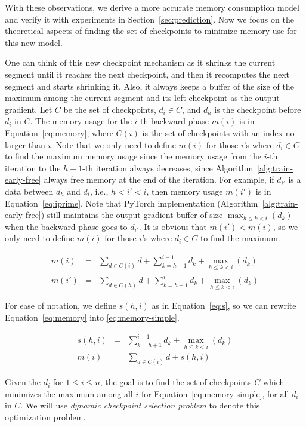 With these observations, we derive a more accurate memory consumption model and verify it with experiments in Section~\ref{sec:prediction}.
Now we focus on the theoretical aspects of finding the set of checkpoints to minimize memory use for this new model.

One can think of this new checkpoint mechanism as it shrinks the current segment until it reaches the next checkpoint, and then it recomputes the next segment and starts shrinking it. 
Also, it always keeps a buffer of the size of the maximum among the current segment and its left checkpoint as the output gradient.
Let $C$ be the set of checkpoints, $d_i \in C$, and $d_h$ is the checkpoint before $d_i$ in $C$. 
The memory usage for the $i$-th backward phase $m(i)$ is in Equation~\ref{eq:memory}, where $C(i)$ is the set of checkpoints with an index no larger than $i$.
Note that we only need to define $m(i)$ for those $i$'s where $d_i \in C$ to find the maximum memory usage since the memory usage from the $i$-th iteration to the $h-1$-th iteration always decreases, since Algorithm~\ref{alg:train-early-free} always free memory at the end of the iteration.  
For example, if $d_{{i'}}$ is a data between $d_h$ and $d_i$,  i.e., $h < i' < i$, then memory usage $m(i')$ is in Equation~\ref{eq:iprime}.
Note that PyTorch implementation (Algorithm~\ref{alg:train-early-free}) still maintains the output gradient buffer of size $\max_{h \leq k < i}(d_k)$ when the backward phase goes to $d_{i'}$.
It is obvious that $m(i') < m(i)$, so we only need to define $m(i)$ for those $i$'s where $d_i \in C$ to find the maximum.

\begin{eqnarray}
m(i) & = & \sum_{d \in C(i)} d + \sum_{k = h+1}^{i-1} d_k + \max_{h \leq k < i}(d_k) \label{eq:memory} \\
m(i') & = & \sum_{d \in C(h)} d + \sum_{k = h+1}^{i'} d_k + \max_{h \leq k < i}(d_k) \label{eq:iprime} 
\end{eqnarray}

For ease of notation, we define $s(h, i)$ as in Equation~\ref{eq:s}, so we can rewrite Equation~\ref{eq:memory} into \ref{eq:memory-simple}.

\begin{eqnarray}
s(h, i) & = & \sum_{k = h+1}^{i-1} d_k + \max_{h \leq k < i}(d_k) \label{eq:s} \\
m(i) & = & \sum_{d \in C(i)} d + s(h, i) \label{eq:memory-simple}
\end{eqnarray}

Given the $d_i$ for $1 \leq i \leq n$, the goal is to find the set of checkpoints $C$ which minimizes the maximum among all $i$ for Equation~\ref{eq:memory-simple}, for all $d_i$ in $C$.
We will use {\em dynamic checkpoint selection problem} to denote this optimization problem.
